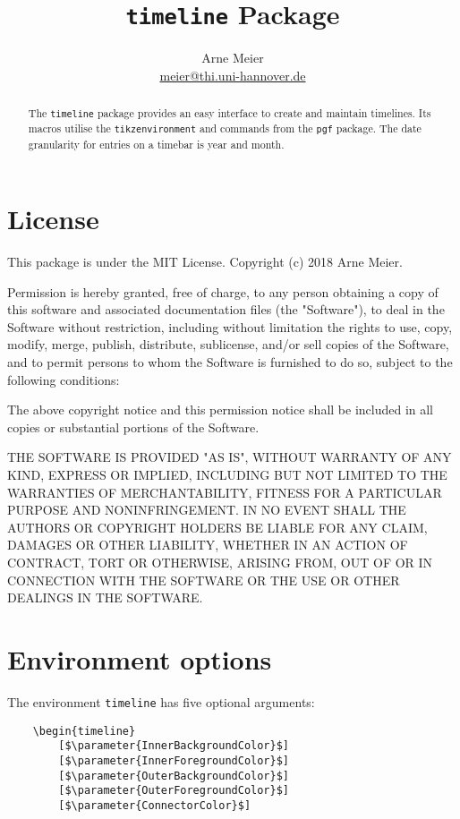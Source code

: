 \documentclass{article}
\author{Arne Meier\\\url{meier@thi.uni-hannover.de}}
\title{\texttt{timeline} Package}
\newcommand{\parameter}[1]{\langle\normalfont\textit{#1}\rangle}
\begin{document}
\maketitle
\begin{abstract}
	The \texttt{timeline} package provides an easy interface to create and maintain timelines.
	Its macros utilise the \texttt{tikzenvironment} and commands from the  \texttt{pgf} package.
	The date granularity for entries on a timebar is year and month.
\end{abstract}

\section{License}
This package is under the MIT License. Copyright (c) 2018 Arne Meier.

Permission is hereby granted, free of charge, to any person obtaining a copy
of this software and associated documentation files (the "Software"), to deal
in the Software without restriction, including without limitation the rights
to use, copy, modify, merge, publish, distribute, sublicense, and/or sell
copies of the Software, and to permit persons to whom the Software is
furnished to do so, subject to the following conditions:

The above copyright notice and this permission notice shall be included in all
copies or substantial portions of the Software.

THE SOFTWARE IS PROVIDED "AS IS", WITHOUT WARRANTY OF ANY KIND, EXPRESS OR
IMPLIED, INCLUDING BUT NOT LIMITED TO THE WARRANTIES OF MERCHANTABILITY,
FITNESS FOR A PARTICULAR PURPOSE AND NONINFRINGEMENT. IN NO EVENT SHALL THE
AUTHORS OR COPYRIGHT HOLDERS BE LIABLE FOR ANY CLAIM, DAMAGES OR OTHER
LIABILITY, WHETHER IN AN ACTION OF CONTRACT, TORT OR OTHERWISE, ARISING FROM,
OUT OF OR IN CONNECTION WITH THE SOFTWARE OR THE USE OR OTHER DEALINGS IN THE
SOFTWARE.

\section{Environment options}
The environment \texttt{timeline} has five optional arguments:
\begin{center}
\begin{lstlisting}
	\begin{timeline}
		[$\parameter{InnerBackgroundColor}$]
		[$\parameter{InnerForegroundColor}$]
		[$\parameter{OuterBackgroundColor}$]
		[$\parameter{OuterForegroundColor}$]
		[$\parameter{ConnectorColor}$]
\end{lstlisting}
\end{center}
\end{document}

